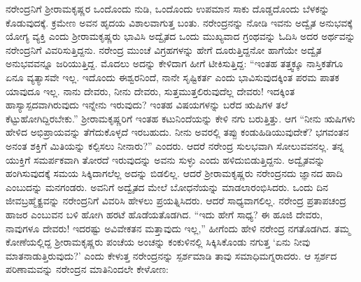 ನರೇಂದ್ರನಿಗೆ ಶ‍್ರೀರಾಮಕೃಷ್ಣರ ಒಂದೊಂದು ನುಡಿ, ಒಂದೊಂದು ಉಪಮಾನ ಸಾಕು ದೊಡ್ಡದೊಂದು ಬೆಳಕನ್ನು ಕೊಡುವುದಕ್ಕೆ. ಕ್ರಮೇಣ ಅವನ ಹೃದಯ ವಿಶಾಲವಾಗುತ್ತ ಬಂತು. ನರೇಂದ್ರನನ್ನು ನೋಡಿ ಇವನು ಅದ್ವೈತ ಅನುಭವಕ್ಕೆ ಯೋಗ್ಯ ವ್ಯಕ್ತಿ ಎಂದು ಶ‍್ರೀರಾಮಕೃಷ್ಣರು ಭಾವಿಸಿ ಅದ್ವೈತದ ಒಂದು ಮುಖ್ಯವಾದ ಗ್ರಂಥವನ್ನು ಓದಿಸಿ ಅದರ ಅರ್ಥವನ್ನು ನರೇಂದ್ರನಿಗೆ ವಿವರಿಸುತ್ತಿದ್ದನು. ನರೇಂದ್ರ ಮುಂಚೆ ವಿಗ್ರಹಗಳನ್ನು ಹೇಗೆ ದೂರುತ್ತಿದ್ದನೋ ಹಾಗೆಯೇ ಅದ್ವೈತ ಅನುಭವವನ್ನೂ ಜರಿಯುತ್ತಿದ್ದ. ಮೊದಲು ಅದನ್ನು ಕೇಳಿದಾಗ ಹೀಗೆ ಟೀಕಿಸುತ್ತಿದ್ದ: “ಇಂತಹ ತತ್ತ್ವಕ್ಕೂ ನಾಸ್ತಿಕತೆಗೂ ಏನೂ ವ್ಯತ್ಯಾಸವೇ ಇಲ್ಲ. ಇದೊಂದು ಈಶ್ವರನಿಂದೆ, ನಾನೇ ಸೃಷ್ಟಿಕರ್ತ ಎಂದು ಭಾವಿಸುವುದಕ್ಕಿಂತ ಪರಮ ಪಾತಕ ಯಾವುದೂ ಇಲ್ಲ. ನಾನು ದೇವರು, ನೀನು ದೇವರು, ಸುತ್ತಮುತ್ತಲಿರುವುದೆಲ್ಲ ದೇವರು! ಇದಕ್ಕಿಂತ ಹಾಸ್ಯಾಸ್ಪದವಾಗಿರುವುದು ಇನ್ನೇನು ಇರುವುದು? ಇಂತಹ ವಿಷಯಗಳನ್ನು ಬರೆದ ಋಷಿಗಳ ತಲೆ ಕೆಟ್ಟುಹೋಗಿದ್ದಿರಬೇಕು.” ಶ‍್ರೀರಾಮಕೃಷ್ಣರಿಗೆ ಇಂತಹ ಕಟುನಿಂದೆಯನ್ನು ಕೇಳಿ ನಗು ಬರುತ್ತಿತ್ತು. ಆಗ “ನೀನು ಋಷಿಗಳು ಹೇಳಿದ ಅಭಿಪ್ರಾಯವನ್ನು ತೆಗೆದುಕೊಳ್ಳದೆ ಇರಬಹುದು. ನೀನು ಅವರಲ್ಲಿ ತಪ್ಪು ಕಂಡುಹಿಡಿಯುವುದೇಕೆ? ಭಗವಂತನ ಅನಂತ ಶಕ್ತಿಗೆ ಮಿತಿಯನ್ನು ಕಲ್ಪಿಸಲು ನೀನಾರು?” ಎಂದರು. ಆದರೆ ನರೇಂದ್ರ ಸುಲಭವಾಗಿ ಸೋಲುವವನಲ್ಲ. ತನ್ನ ಯುಕ್ತಿಗೆ ಸಮರ್ಪಕವಾಗಿ ತೋರದೆ ಇರುವುದನ್ನು ಅವನು ಸುಳ್ಳು ಎಂದು ಹಳಿದುಬಿಡುತ್ತಿದ್ದನು. ಅದ್ವೈತವನ್ನು ಹಂಗಿಸುವುದಕ್ಕೆ ಸಮಯ ಸಿಕ್ಕಿದಾಗಲೆಲ್ಲ ಅದನ್ನು ಬಿಡಲಿಲ್ಲ. ಆದರೆ ಶ‍್ರೀರಾಮಕೃಷ್ಣರು ನರೇಂದ್ರನದು ಜ್ಞಾನದ ಹಾದಿ ಎಂಬುದನ್ನು ಮನಗಂಡರು. ಅವನಿಗೆ ಅದ್ವೈತದ ಮೇಲೆ ಬೋಧನೆಯನ್ನು ಮಾಡಲಾರಂಭಿಸಿದರು. ಒಂದು ದಿನ ಜೀವಬ್ರಹ್ಮೈಕ್ಯವನ್ನು ನರೇಂದ್ರನಿಗೆ ವಿವರಿಸಿ ಹೇಳಲು ಪ್ರಯತ್ನಿಸಿದರು. ಆದರೆ ಸಾಧ್ಯವಾಗಲಿಲ್ಲ. ನರೇಂದ್ರ ಪ್ರತಾಪಚಂದ್ರ ಹಾಜರ ಎಂಬುವನ ಬಳಿ ಹೋಗಿ ಹರಟೆ ಹೊಡೆಯತೊಡಗಿದ. “ಇದು ಹೇಗೆ ಸಾಧ್ಯ? ಈ ಹೂಜಿ ದೇವರು, ನಾವುಗಳೂ ದೇವರು! ಇದರಷ್ಟು ಅವಿವೇಕತನ ಮತ್ತಾವುದು ಇಲ್ಲ,” ಹೀಗೆಂದು ಹೇಳಿ ನರೇಂದ್ರ ನಗತೊಡಗಿದ. ತಮ್ಮ ಕೋಣೆಯಲ್ಲಿದ್ದ ಶ‍್ರೀರಾಮಕೃಷ್ಣರು ಪಂಚೆಯ ಅಂಚನ್ನು ಕಂಕುಳಿನಲ್ಲಿ ಸಿಕ್ಕಿಸಿಕೊಂಡು ನಗುತ್ತ ‘ಏನು ನೀವು ಮಾತನಾಡುತ್ತಿರುವುದು?’ ಎಂದು ಕೇಳುತ್ತ ನರೇಂದ್ರನನ್ನು ಸ್ಪರ್ಶಮಾಡಿ ತಾವು ಸಮಾಧಿಮಗ್ನರಾದರು. ಆ ಸ್ಪರ್ಶದ ಪರಿಣಾಮವನ್ನು ನರೇಂದ್ರನ ಮಾತಿನಿಂದಲೇ ಕೇಳೋಣ:


